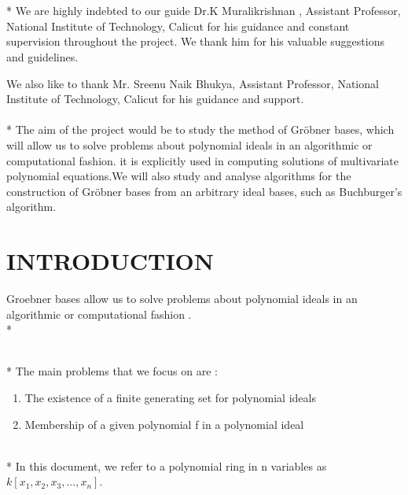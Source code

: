 \documentclass[12pt]{article}
\begin{document}

%
%
\makefrontpage
\setcounter{page}{2}
\setcounter{section}{0}
\pagestyle{plain}

\newpage
{}\\\\*
\indent \indent We are highly indebted to our guide Dr.K Muralikrishnan , Assistant Professor, National Institute of Technology, Calicut for his guidance and constant supervision throughout the project. We thank him for his valuable suggestions and guidelines. 

We also like to thank Mr. Sreenu Naik Bhukya, Assistant Professor, National Institute of Technology, Calicut for his guidance and support.
\newpage
{}\\\\*
\indent \indent The aim of the project would be to study the method of Gr\"{o}bner bases, which will allow us to solve problems about polynomial ideals in an algorithmic or computational fashion. it is explicitly used in computing solutions of multivariate polynomial equations.We will also study and analyse algorithms for the construction of Gr\"{o}bner bases from an arbitrary ideal bases, such as Buchburger's algorithm.
\newpage
\section{INTRODUCTION}
Groebner bases allow us to solve problems about polynomial
ideals in an algorithmic or computational fashion .
\\*

\\*
The main problems that we focus on are :\\
\begin{enumerate}
\item The existence of a finite generating set for polynomial ideals
\item Membership of a given polynomial f in a polynomial ideal
\end{enumerate}
\\*
In this document, we refer to a polynomial ring in n variables as $k[x_{1} ,x_{2} ,x_{3},...,x_{n}]$.\\
\end{document}
